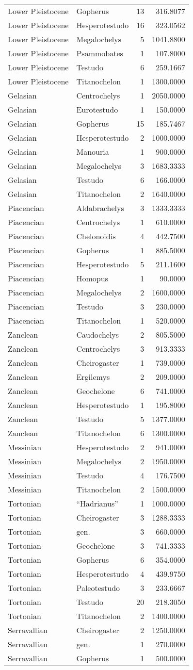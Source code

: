 \begin{longtable}[]{@{}llrr@{}}
	Lower Pleistocene & Gopherus & 13 & 316.8077\tabularnewline
	Lower Pleistocene & Hesperotestudo & 16 & 323.0562\tabularnewline
	Lower Pleistocene & Megalochelys & 5 & 1041.8800\tabularnewline
	Lower Pleistocene & Psammobates & 1 & 107.8000\tabularnewline
	Lower Pleistocene & Testudo & 6 & 259.1667\tabularnewline
	Lower Pleistocene & Titanochelon & 1 & 1300.0000\tabularnewline
	Gelasian & Centrochelys & 1 & 2050.0000\tabularnewline
	Gelasian & Eurotestudo & 1 & 150.0000\tabularnewline
	Gelasian & Gopherus & 15 & 185.7467\tabularnewline
	Gelasian & Hesperotestudo & 2 & 1000.0000\tabularnewline
	Gelasian & Manouria & 1 & 900.0000\tabularnewline
	Gelasian & Megalochelys & 3 & 1683.3333\tabularnewline
	Gelasian & Testudo & 6 & 166.0000\tabularnewline
	Gelasian & Titanochelon & 2 & 1640.0000\tabularnewline
	Piacencian & Aldabrachelys & 3 & 1333.3333\tabularnewline
	Piacencian & Centrochelys & 1 & 610.0000\tabularnewline
	Piacencian & Chelonoidis & 4 & 442.7500\tabularnewline
	Piacencian & Gopherus & 1 & 885.5000\tabularnewline
	Piacencian & Hesperotestudo & 5 & 211.1600\tabularnewline
	Piacencian & Homopus & 1 & 90.0000\tabularnewline
	Piacencian & Megalochelys & 2 & 1600.0000\tabularnewline
	Piacencian & Testudo & 3 & 230.0000\tabularnewline
	Piacencian & Titanochelon & 1 & 520.0000\tabularnewline
	Zanclean & Caudochelys & 2 & 805.5000\tabularnewline
	Zanclean & Centrochelys & 3 & 913.3333\tabularnewline
	Zanclean & Cheirogaster & 1 & 739.0000\tabularnewline
	Zanclean & Ergilemys & 2 & 209.0000\tabularnewline
	Zanclean & Geochelone & 6 & 741.0000\tabularnewline
	Zanclean & Hesperotestudo & 1 & 195.8000\tabularnewline
	Zanclean & Testudo & 5 & 1377.0000\tabularnewline
	Zanclean & Titanochelon & 6 & 1300.0000\tabularnewline
	Messinian & Hesperotestudo & 2 & 941.0000\tabularnewline
	Messinian & Megalochelys & 2 & 1950.0000\tabularnewline
	Messinian & Testudo & 4 & 176.7500\tabularnewline
	Messinian & Titanochelon & 2 & 1500.0000\tabularnewline
	Tortonian & ``Hadrianus'' & 1 & 1000.0000\tabularnewline
	Tortonian & Cheirogaster & 3 & 1288.3333\tabularnewline
	Tortonian & gen. & 3 & 660.0000\tabularnewline
	Tortonian & Geochelone & 3 & 741.3333\tabularnewline
	Tortonian & Gopherus & 6 & 354.0000\tabularnewline
	Tortonian & Hesperotestudo & 4 & 439.9750\tabularnewline
	Tortonian & Paleotestudo & 3 & 233.6667\tabularnewline
	Tortonian & Testudo & 20 & 218.3050\tabularnewline
	Tortonian & Titanochelon & 2 & 1400.0000\tabularnewline
	Serravallian & Cheirogaster & 2 & 1250.0000\tabularnewline
	Serravallian & gen. & 1 & 270.0000\tabularnewline
	Serravallian & Gopherus & 1 & 500.0000\tabularnewline

\end{longtable}
